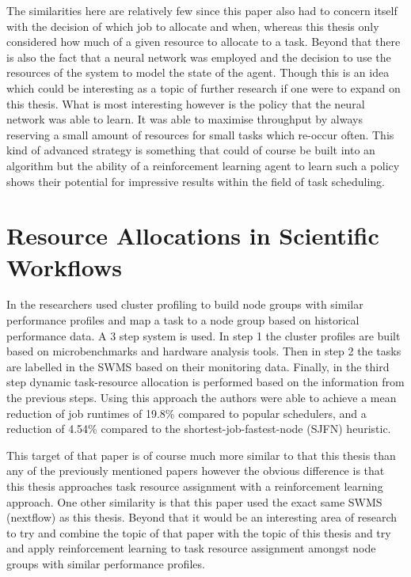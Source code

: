 The similarities here are relatively few since this paper also had to concern itself with the decision of which job to allocate and when, whereas this thesis only considered how much of a given resource to allocate to a task. Beyond that there is also the fact that a neural network was employed and the decision to use the resources of the system to model the state of the agent. Though this is an idea which could be interesting as a topic of further research if one were to expand on this thesis. What is most interesting however is the policy that the neural network was able to learn. It was able to maximise throughput by always reserving a small amount of resources for small tasks which re-occur often. This kind of advanced strategy is something that could of course be built into an algorithm but the ability of a reinforcement learning agent to learn such a policy shows their potential for impressive results within the field of task scheduling.

\section{Resource Allocations in Scientific Workflows}
\label{sec:workflow_allocation_papers}

 In \cite{tarema} the researchers used cluster profiling to build node groups with similar performance profiles and map a task to a node group based on historical performance data. A 3 step system is used. In step 1 the cluster profiles are built based on microbenchmarks and hardware analysis tools. Then in step 2 the tasks are labelled in the SWMS based on their monitoring data. Finally, in the third step dynamic task-resource allocation is performed based on the information from the previous steps. Using this approach the authors were able to achieve a mean reduction of job runtimes of 19.8\% compared to popular schedulers, and a reduction of 4.54\% compared to the shortest-job-fastest-node (SJFN) heuristic. 

This target of that paper is of course much more similar to that this thesis than any of the previously mentioned papers however the obvious difference is that this thesis approaches task resource assignment with a reinforcement learning approach. One other similarity is that this paper used the exact same SWMS (nextflow) as this thesis. Beyond that it would be an interesting area of research to try and combine the topic of that paper with the topic of this thesis and try and apply reinforcement learning to task resource assignment amongst node groups with similar performance profiles.

